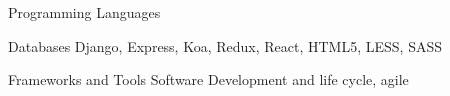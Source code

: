 

\begin{cvskills}

  \cvskill
    {Programming} %
    {Languages} %

  \cvskill
    {Databases} %
    {Django, Express, Koa, Redux, React, HTML5, LESS, SASS} %

  \cvskill
    {Frameworks and Tools} %
    {Software Development and life cycle, agile} %

\end{cvskills}
